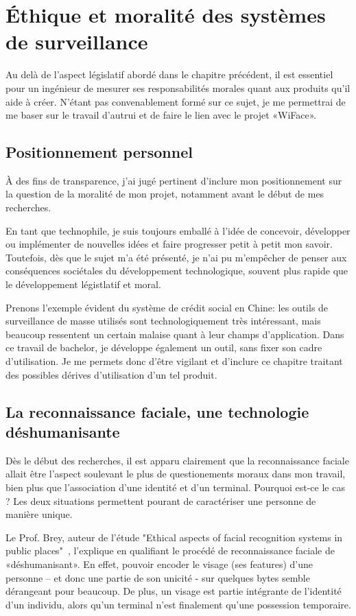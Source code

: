 \chapter{Éthique et moralité des systèmes de surveillance}
\label{ch:etudemoralite}

Au delà de l’aspect législatif abordé dans le chapitre précédent, il est essentiel pour un ingénieur de mesurer ses
responsabilités morales quant aux produits qu’il aide à créer. N’étant pas convenablement formé sur ce sujet, je
me permettrai de me baser sur le travail d’autrui et de faire le lien avec le projet «WiFace».

\section{Positionnement personnel}
À des fins de transparence, j'ai jugé pertinent d'inclure mon positionnement sur la question de la moralité de mon projet,
notamment avant le début de mes recherches.

En tant que technophile, je suis toujours emballé à l'idée de concevoir, développer ou implémenter de nouvelles idées et faire progresser petit à
petit mon savoir. 
Toutefois, dès que le sujet m'a été présenté, je n'ai pu m'empêcher de penser aux conséquences sociétales du développement technologique, 
souvent plus rapide que le développement légistlatif et moral.

Prenons l'exemple évident du système de crédit social en Chine: les outils de surveillance de masse utilisés sont technologiquement très intéressant, mais
beaucoup ressentent un certain malaise quant à leur champs d'application. Dans ce travail de bachelor, je développe également un outil, sans fixer son cadre d'utilisation.
Je me permets donc d'être vigilant et d'inclure ce chapitre traitant des possibles dérives d'utilisation d'un tel produit. 

\section{La reconnaissance faciale, une technologie déshumanisante}
Dès le début des recherches, il est apparu clairement que la reconnaissance faciale allait être l’aspect soulevant le
plus de questionements moraux dans mon travail, bien plus que l’association d’une identité et d’un terminal.
Pourquoi est-ce le cas ? Les deux situations permettent pourant de caractériser une personne de manière unique.

Le Prof. Brey, auteur de l'étude "Ethical aspects of facial recognition systems in public places"~\cite{brey_2004}, l’explique en qualifiant le procédé de reconnaissance faciale de «déshumanisant». En effet, pouvoir
encoder le visage (ses features) d’une personne – et donc une partie de son unicité - sur quelques bytes semble
dérangeant pour beaucoup. De plus, un visage est partie intégrante de l’identité d’un individu, alors qu’un terminal
n’est finalement qu’une possession temporaire.

